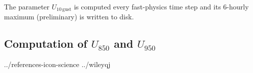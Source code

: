 \documentclass[a4paper,11pt]{article}
\begin{document}
The parameter $U_{10\,\mathrm{gust}}$ is computed every fast-physics time step and its 6-hourly maximum (preliminary) is written to disk.

\subsection{Computation of $U_{850}$ and $U_{950}$}




 {../references-icon-science}
 {../wileyqj} %
\end{document}
